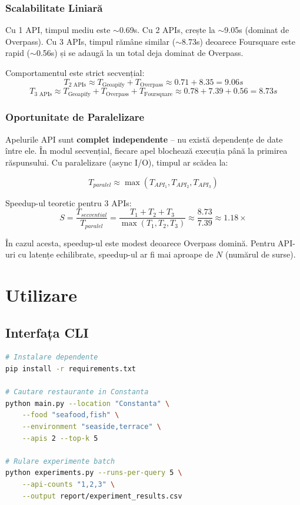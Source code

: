 \documentclass[12pt,a4paper]{article}
\begin{document}
\subsubsection{Scalabilitate Liniară}

Cu 1 API, timpul mediu este $\sim$0.69s. Cu 2 APIs, crește la $\sim$9.05s (dominat de Overpass). Cu 3 APIs, timpul rămâne similar ($\sim$8.73s) deoarece Foursquare este rapid ($\sim$0.56s) și se adaugă la un total deja dominat de Overpass.

Comportamentul este strict secvențial:
$$T_{2\text{ APIs}} \approx T_{\text{Geoapify}} + T_{\text{Overpass}} \approx 0.71 + 8.35 = 9.06s$$
$$T_{3\text{ APIs}} \approx T_{\text{Geoapify}} + T_{\text{Overpass}} + T_{\text{Foursquare}} \approx 0.78 + 7.39 + 0.56 = 8.73s$$

\subsubsection{Oportunitate de Paralelizare}

Apelurile API sunt \textbf{complet independente} -- nu există dependențe de date între ele. În modul secvențial, fiecare apel blochează execuția până la primirea răspunsului. Cu paralelizare (async I/O), timpul ar scădea la:

$$T_{paralel} \approx \max(T_{API_1}, T_{API_2}, T_{API_3})$$

Speedup-ul teoretic pentru 3 APIs:
$$S = \frac{T_{secvential}}{T_{paralel}} = \frac{T_1 + T_2 + T_3}{\max(T_1, T_2, T_3)} \approx \frac{8.73}{7.39} \approx 1.18\times$$

În cazul acesta, speedup-ul este modest deoarece Overpass domină. Pentru API-uri cu latențe echilibrate, speedup-ul ar fi mai aproape de $N$ (numărul de surse).

\section{Utilizare}

\subsection{Interfața CLI}

\begin{lstlisting}[language=bash, caption={Exemple de utilizare}]
# Instalare dependente
pip install -r requirements.txt

# Cautare restaurante in Constanta
python main.py --location "Constanta" \
    --food "seafood,fish" \
    --environment "seaside,terrace" \
    --apis 2 --top-k 5

# Rulare experimente batch
python experiments.py --runs-per-query 5 \
    --api-counts "1,2,3" \
    --output report/experiment_results.csv
\end{lstlisting}
\end{document}
